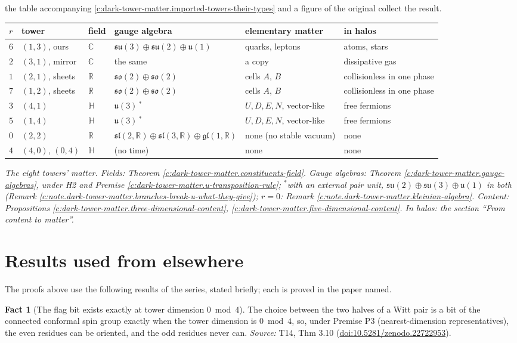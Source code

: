 \documentclass[11pt]{article}
\theoremstyle{definition}
\newtheorem{fact}[theorem]{Fact}
\theoremstyle{plain}
\providecommand{\C}{}\renewcommand{\C}{\mathbb{C}}
\providecommand{\HH}{}\renewcommand{\HH}{\mathbb{H}}
\providecommand{\R}{}\renewcommand{\R}{\mathbb{R}}
\providecommand{\gl}{}\renewcommand{\gl}{\mathfrak{gl}}
\providecommand{\sll}{}\renewcommand{\sll}{\mathfrak{sl}}
\providecommand{\so}{}\renewcommand{\so}{\mathfrak{so}}
\providecommand{\su}{}\renewcommand{\su}{\mathfrak{su}}
\providecommand{\uu}{}\renewcommand{\uu}{\mathfrak{u}}
\begin{document}
the table accompanying \ref{c:dark-tower-matter.imported-towers-their-types} and a figure of the original collect the result.

\centering  
\begin{tabular}{@{}llllll@{}}
\toprule
$r$ & tower & field & gauge algebra & elementary matter & in halos \\
\midrule
$6$ & $(1,3)$, ours & $\C$ & $\su(3) \oplus \su(2) \oplus \uu(1)$ & quarks, leptons & atoms, stars \\
$2$ & $(3,1)$, mirror & $\C$ & the same & a copy & dissipative gas \\
$1$ & $(2,1)$, sheets & $\R$ & $\so(2) \oplus \so(2)$ & cells $A$, $B$ & collisionless in one phase \\
$7$ & $(1,2)$, sheets & $\R$ & $\so(2) \oplus \so(2)$ & cells $A$, $B$ & collisionless in one phase \\
$3$ & $(4,1)$ & $\HH$ & $\uu(3)$\,$^{*}$ & $U, D, E, N$, vector-like & free fermions \\
$5$ & $(1,4)$ & $\HH$ & $\uu(3)$\,$^{*}$ & $U, D, E, N$, vector-like & free fermions \\
$0$ & $(2,2)$ & $\R$ & $\sll(2,\R) \oplus \sll(3,\R) \oplus \gl(1,\R)$ & none (no stable vacuum) & none \\
$4$ & $(4,0)$, $(0,4)$ & $\HH$ & (no time) & none & none \\
\bottomrule
\end{tabular}

\emph{The eight towers' matter. Fields: Theorem \ref{c:dark-tower-matter.constituents-field}. Gauge algebras: Theorem \ref{c:dark-tower-matter.gauge-algebras}, under H2 and Premise \ref{c:dark-tower-matter.u-transposition-rule}; $^{*}$with an external pair unit, $\su(2) \oplus \su(3) \oplus \uu(1)$ in both (Remark \ref{c:note.dark-tower-matter.branches-break-u-what-they-give}); $r = 0$: Remark \ref{c:note.dark-tower-matter.kleinian-algebra}. Content: Propositions \ref{c:dark-tower-matter.three-dimensional-content}, \ref{c:dark-tower-matter.five-dimensional-content}. In halos: the section ``From content to matter''.}

\section{Results used from elsewhere}
The proofs above use the following results of the series, stated briefly; each is proved in the paper named.

\begin{fact}[The flag bit exists exactly at tower dimension $0 \bmod 4$]\label{c:dark-matter.flag-bit-exists-exactly-tower-dimension}
The choice between the two halves of a Witt pair is a bit of the connected conformal spin group exactly when the tower dimension is $0 \bmod 4$, so, under Premise P3 (nearest-dimension representatives), the even residues can be oriented, and the odd residues never can.
\emph{Source:} T14, Thm 3.10 (\href{https://doi.org/10.5281/zenodo.22722953}{doi:10.5281/zenodo.22722953}).
\end{fact}
\end{document}
